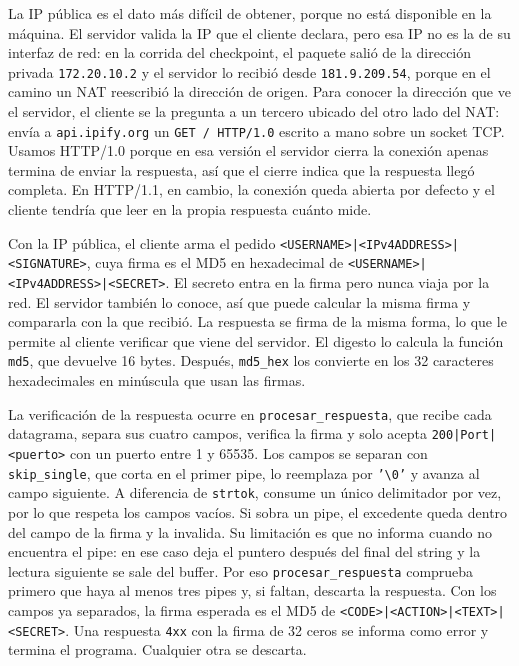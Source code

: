 \documentclass[11pt,a4paper]{article}
\newcommand{\code}[1]{\texttt{#1}}
\begin{document}
La IP pública es el dato más difícil de obtener, porque no está disponible en la máquina. El servidor valida la IP que el cliente declara, pero esa IP no es la de su interfaz de red: en la corrida del checkpoint, el paquete salió de la dirección privada \code{172.20.10.2} y el servidor lo recibió desde \code{181.9.209.54}, porque en el camino un
NAT reescribió la dirección de origen. Para conocer la dirección que ve el
servidor, el cliente se la pregunta a un tercero ubicado del otro lado del NAT: envía a \code{api.ipify.org} un
\code{GET / HTTP/1.0} escrito a mano sobre un socket TCP. Usamos HTTP/1.0 porque en esa versión el servidor cierra la conexión apenas termina de enviar la respuesta,
así que el cierre indica que la respuesta llegó completa. En HTTP/1.1, en cambio, la conexión queda abierta por
defecto y el cliente tendría que leer en la propia respuesta cuánto mide.

Con la IP pública, el cliente arma el pedido \code{<USERNAME>|<IPv4ADDRESS>|<SIGNATURE>}, cuya firma es el MD5 en
hexadecimal de \code{<USERNAME>|<IPv4ADDRESS>|<SECRET>}. El secreto entra en la firma pero
nunca viaja por la red. El servidor también lo conoce, así que puede calcular la misma firma y compararla con la
que recibió. La respuesta se firma de la misma forma, lo que le permite al cliente verificar que viene del servidor. El digesto lo calcula la función \code{md5}, que devuelve 16 bytes. Después, \code{md5\_hex} los convierte en los 32 caracteres hexadecimales en minúscula que usan las firmas.

La verificación de la respuesta ocurre en \code{procesar\_respuesta}, que recibe cada datagrama, separa sus cuatro
campos, verifica la firma y solo acepta \code{200|Port|<puerto>} con un puerto entre 1 y 65535. Los campos se
separan con \code{skip\_single}, que corta en el primer pipe, lo reemplaza por
\code{'\textbackslash 0'} y avanza al campo siguiente. A diferencia de \code{strtok}, consume un único delimitador
por vez, por lo que respeta los campos vacíos. Si sobra un pipe, el excedente queda dentro del campo de la firma y
la invalida. Su limitación es que no informa cuando no encuentra el pipe: en ese caso deja el puntero después del
final del string y la lectura siguiente se sale del buffer. Por eso \code{procesar\_respuesta} comprueba primero
que haya al menos tres pipes y, si faltan, descarta la respuesta. Con los campos
ya separados, la firma esperada es el MD5 de \code{<CODE>|<ACTION>|<TEXT>|<SECRET>}. Una respuesta \code{4xx} con la
firma de 32 ceros se informa como error y termina el programa. Cualquier otra se descarta.
\end{document}
